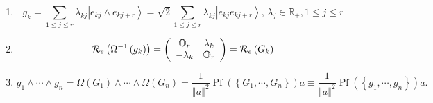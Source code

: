 \documentclass[aps,preprint]{revtex4}%
\begin{document}
\begin{enumerate}
\item
\begin{equation}
g_{k}=\sum_{1\leq j\leq r}\lambda_{kj}\left\vert e_{kj}\wedge e_{kj+r}%
\right\rangle =\sqrt{2}\sum_{1\leq j\leq r}\lambda_{kj}\left\vert
e_{kj}e_{kj+r}\right\rangle ,\,\lambda_{j}\in\mathbb{R}_{+},1\leq j\leq r
\end{equation}


\item
\begin{equation}
\mathcal{R}_{e}\left(  \Omega^{-1}\left(  g_{k}\right)  \right)  =\left(
\begin{array}
[c]{cc}%
\mathbb{O}_{r} & \mathbf{\lambda}_{k}\\
-\mathbf{\lambda}_{k} & \mathbb{O}_{r}%
\end{array}
\right)  =\mathcal{R}_{e}\left(  G_{k}\right)
\end{equation}


\item
\begin{equation}
g_{1}\wedge\cdots\wedge g_{n}=\Omega\left(  G_{1}\right)  \wedge\cdots
\wedge\Omega\left(  G_{n}\right)  =\frac{1}{\left\Vert a\right\Vert ^{2}%
}\operatorname{Pf}\left(  \left\{  G_{1},\cdots,G_{n}\right\}  \right)
a\equiv\frac{1}{\left\Vert a\right\Vert ^{2}}\operatorname{Pf}\left(  \left\{
g_{1},\cdots,g_{n}\right\}  \right)  a.
\end{equation}

\end{enumerate}
\end{document}
